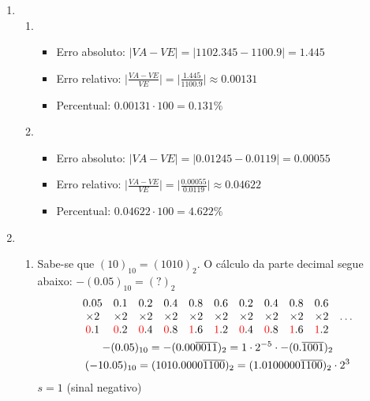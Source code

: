 \documentclass{article}
\newcommand\redn[1]{\textcolor{red}{#1}}
\newenvironment{arabenum}{
    \begin{enumerate}[label=\textbf{\arabic*})]
}{
    \end{enumerate}
}
\newenvironment{alphenum}{
    \begin{enumerate}[label=(\alph*)]
}{
    \end{enumerate}
}
\begin{document}
\begin{arabenum}
\item \begin{alphenum}

\item \begin{itemize}

\item Erro absoluto: $\vert VA - VE \vert = \vert 1102.345 - 1100.9 \vert
= \boldsymbol{1.445}$

\item Erro relativo: $\big\vert\frac{VA - VE}{VE}\big\vert
= \big\vert\frac{1.445}{1100.9}\big\vert \approx \boldsymbol{0.00131}$

\item Percentual: $0.00131 \cdot 100 = \boldsymbol{0.131\%}$

\end{itemize}

\item \begin{itemize}

\item Erro absoluto: $\vert VA - VE \vert = \vert 0.01245 - 0.0119 \vert
= \boldsymbol{0.00055}$

\item Erro relativo: $\big\vert\frac{VA - VE}{VE}\big\vert
= \big\vert\frac{0.00055}{0.0119}\big\vert \approx \boldsymbol{0.04622}$

\item Percentual: $0.04622 \cdot 100 = \boldsymbol{4.622\%}$

\end{itemize}

\end{alphenum}

\item \begin{alphenum}

\item Sabe-se que $(10)_{10} = (1010)_2$. O cálculo da parte decimal segue
abaixo: $-(0.05)_{10} = (?)_2$
\begin{gather*}
\begin{array}{*{11}c}
0.05 & 0.1 & 0.2 & 0.4 & 0.8 & 0.6 & 0.2 & 0.4 & 0.8 & 0.6 & \\
\times 2 & \times 2 & \times 2 & \times 2 & \times 2 & \times 2 & \times 2 &
\times 2 & \times 2 & \times 2 & \dots \\
\redn{0}.1 & \redn{0}.2 & \redn{0}.4 & \redn{0}.8 & \redn{1}.6 & \redn{1}.2 &
\redn{0}.4 & \redn{0}.8 & \redn{1}.6 & \redn{1}.2 &
\end{array} \\
-(0.05)_{10} = -(0.00\overline{0011})_2 =
1 \cdot 2^{-5} \cdot -(0.\overline{1001})_2 \\
(-10.05)_{10} = (1010.0000\overline{1100})_2 = (1.0100000\overline{1100})_2
\cdot 2^{3}
\end{gather*}
$s = 1$ (sinal negativo)


\end{alphenum}
\end{arabenum}
\end{document}
